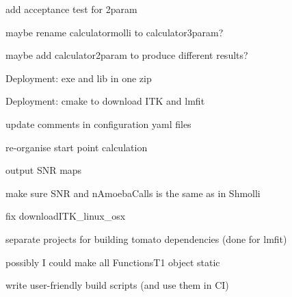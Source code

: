 \begin{DoxyItemize}
\item add acceptance test for 2param
\item maybe rename calculatormolli to calculator3param?
\item maybe add calculator2param to produce different results?
\item Deployment\-: exe and lib in one zip
\item Deployment\-: cmake to download I\-T\-K and lmfit
\item update comments in configuration yaml files
\item re-\/organise start point calculation
\item output S\-N\-R maps
\item make sure S\-N\-R and n\-Amoeba\-Calls is the same as in Shmolli
\item fix download\-I\-T\-K\-\_\-linux\-\_\-osx
\item separate projects for building tomato dependencies (done for lmfit)
\item possibly I could make all Functions\-T1 object static
\item write user-\/friendly build scripts (and use them in C\-I) 
\end{DoxyItemize}